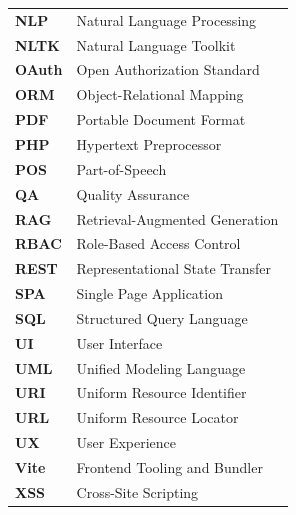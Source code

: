 \begin{flushleft}
\begin{tabular}{l p{0.78\linewidth}}
\textbf{NLP}   & Natural Language Processing\\
\textbf{NLTK}  & Natural Language Toolkit\\
\textbf{OAuth} & Open Authorization Standard\\
\textbf{ORM}   & Object-Relational Mapping\\
\textbf{PDF}   & Portable Document Format\\
\textbf{PHP}   & Hypertext Preprocessor\\
\textbf{POS}   & Part-of-Speech\\
\textbf{QA}    & Quality Assurance\\
\textbf{RAG}   & Retrieval-Augmented Generation\\
\textbf{RBAC}  & Role-Based Access Control\\
\textbf{REST}  & Representational State Transfer\\
\textbf{SPA}   & Single Page Application\\
\textbf{SQL}   & Structured Query Language\\
\textbf{UI}    & User Interface\\
\textbf{UML}   & Unified Modeling Language\\
\textbf{URI}   & Uniform Resource Identifier\\
\textbf{URL}   & Uniform Resource Locator\\
\textbf{UX}    & User Experience\\
\textbf{Vite}  & Frontend Tooling and Bundler\\
\textbf{XSS}   & Cross-Site Scripting\\
\end{tabular}
\end{flushleft}
